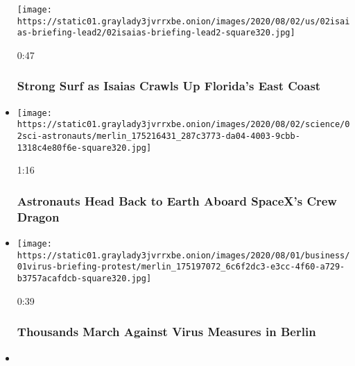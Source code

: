 \begin{itemize}
  \texttt{[image: https://static01.graylady3jvrrxbe.onion/images/2020/08/02/us/02isaias-briefing-lead2/02isaias-briefing-lead2-square320.jpg]}

  0:47

  \hypertarget{strong-surf-as-isaias-crawls-up-floridas-east-coast}{%
  \subsubsection{Strong Surf as Isaias Crawls Up Florida's East
  Coast}\label{strong-surf-as-isaias-crawls-up-floridas-east-coast}}
\item
  \href{https://www.nytimes3xbfgragh.onion/video/us/100000007268936/spacex-departs-international-space-station.html?action=click\&module=video-series-bar\&region=header\&pgtype=Article\&playlistId=video/latest-video}{}

  \texttt{[image: https://static01.graylady3jvrrxbe.onion/images/2020/08/02/science/02sci-astronauts/merlin\_175216431\_287c3773-da04-4003-9cbb-1318c4e80f6e-square320.jpg]}

  1:16

  \hypertarget{astronauts-head-back-to-earth-aboard-spacexs-crew-dragon}{%
  \subsubsection{Astronauts Head Back to Earth Aboard SpaceX's Crew
  Dragon}\label{astronauts-head-back-to-earth-aboard-spacexs-crew-dragon}}
\item
  \href{https://www.nytimes3xbfgragh.onion/video/world/europe/100000007268465/coronavirus-protest-germany.html?action=click\&module=video-series-bar\&region=header\&pgtype=Article\&playlistId=video/latest-video}{}

  \texttt{[image: https://static01.graylady3jvrrxbe.onion/images/2020/08/01/business/01virus-briefing-protest/merlin\_175197072\_6c6f2dc3-e3cc-4f60-a729-b3757acafdcb-square320.jpg]}

  0:39

  \hypertarget{thousands-march-against-virus-measures-in-berlin}{%
  \subsubsection{Thousands March Against Virus Measures in
  Berlin}\label{thousands-march-against-virus-measures-in-berlin}}
\item
  \href{https://www.nytimes3xbfgragh.onion/video/world/middleeast/100000007268443/iran-united-states-nuclear-program-negotiation.html?action=click\&module=video-series-bar\&region=header\&pgtype=Article\&playlistId=video/latest-video}{}


\end{itemize}

